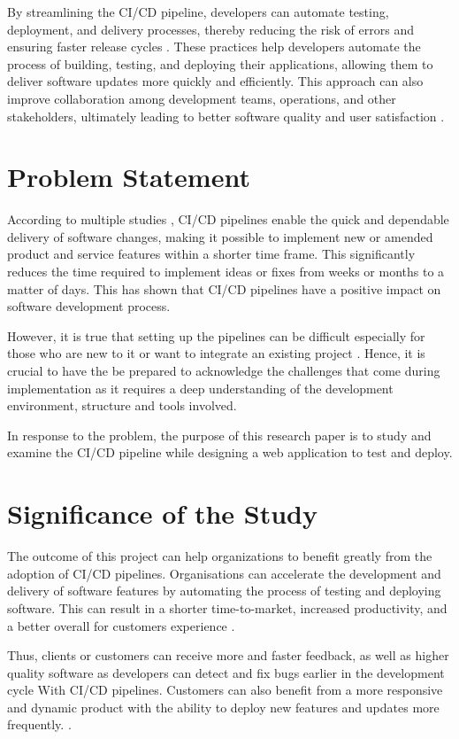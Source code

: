 By streamlining the CI/CD pipeline, developers can automate testing, deployment, and delivery processes, thereby reducing the risk of errors and ensuring faster release cycles \cite{kubinyi}. These practices help developers automate the process of building, testing, and deploying their applications, allowing them to deliver software updates more quickly and efficiently. This approach can also improve collaboration among development teams, operations, and other stakeholders, ultimately leading to better software quality and user satisfaction \cite{bs}.

\section{Problem Statement}
According to multiple studies \cite{sb, saarenpaa2020creating, saz, chen, dm, phillips2015manager}, CI/CD pipelines enable the quick and dependable delivery of software changes, making it possible to implement new or amended product and service features within a shorter time frame. This significantly reduces the time required to implement ideas or fixes from weeks or months to a matter of days. This has shown that CI/CD pipelines have a positive impact on software development process.

However, it is true that setting up the pipelines can be difficult especially for those who are new to it or want to integrate an existing project \cite{sander}. Hence, it is crucial to have the be prepared to acknowledge the challenges that come during implementation as it requires a deep understanding of the development environment, structure and tools involved.

In response to the problem, the purpose of this research paper is to study and examine the CI/CD pipeline while designing a web application to test and deploy.

\section{Significance of the Study}
The outcome of this project can help organizations to benefit greatly from the adoption of CI/CD pipelines. Organisations can accelerate the development and delivery of software features by automating the process of testing and deploying software. This can result in a shorter time-to-market, increased productivity, and a better overall for customers experience \cite{hf}.

Thus, clients or customers can receive more and faster feedback, as well as higher quality software as developers can detect and fix bugs earlier in the development cycle With CI/CD pipelines. Customers can also benefit from a more responsive and dynamic product with the ability to deploy new features and updates more frequently. \cite{chen, leppanenetal}.

